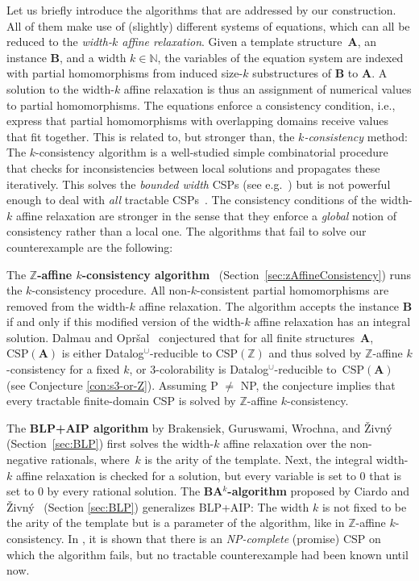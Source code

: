 \documentclass[a4paper,english, thm-restate]{lipics-v2021}
\newcommand{\StructA}{\mathbf{A}}
\newcommand{\StructB}{\mathbf{B}}
\newcommand{\CSP}[1]{\mathrm{CSP}(#1)}
\newcommand{\bbN}{\mathbb{N}}
\newcommand{\bbZ}{\mathbb{Z}}
\begin{document}
	Let us briefly introduce the algorithms that are addressed by our construction.
	All of them make use of (slightly) different systems of equations, which can all be reduced to the \emph{width-$k$ affine relaxation}.
	Given a template structure~$\StructA$, an instance $\StructB$, and a width $k \in \bbN$, the variables of the equation system are indexed with partial homomorphisms from induced size-$k$ substructures of $\StructB$ to $\StructA$. 
	A solution to the width-$k$ affine relaxation is thus an assignment of numerical values to partial homomorphisms. 
	The equations enforce a consistency condition, i.e., express that partial homomorphisms with overlapping domains receive values that fit together. 
	This is related to, but stronger than, the \emph{$k$-consistency} method: The $k$-consistency algorithm is a well-studied simple combinatorial procedure that checks for inconsistencies between local solutions and propagates these iteratively. 
	This solves the \emph{bounded width} CSPs (see e.g.\ \cite{feder1993monotone, barto2009constraint, barto2014}) but is not powerful enough to deal with \emph{all} tractable CSPs~\cite{AtseriasBulatovDalmau2007}. 
	The consistency conditions of the width\nobreakdash-$k$ affine relaxation are stronger in the sense that they enforce a \emph{global} notion of consistency rather than a local one.
	The algorithms that fail to solve our counterexample are the following:
	
	The \textbf{$\bbZ$-affine $k$-consistency algorithm}~\cite{DalmauOprsal2024} (Section~\ref{sec:zAffineConsistency}) runs the $k$-consistency procedure.
	All non-$k$-consistent partial homomorphisms are removed from the width-$k$ affine relaxation.
	The algorithm accepts the instance $\StructB$ if and only if this modified version of the width-$k$ affine relaxation has an integral solution.
	Dalmau and Opr\v{s}al~\cite{DalmauOprsal2024} conjectured that for all finite structures~$\StructA$, $\CSP{\StructA}$ is either Datalog$^\cup$-reducible to $\CSP{\bbZ}$ and thus solved by $\bbZ$-affine $k$-consistency for a fixed $k$, or 3-colorability is Datalog$^\cup$-reducible to~$\CSP{\StructA}$ (see Conjecture \ref{con:s3-or-Z}). Assuming P $\neq$ NP, the conjecture implies that every tractable finite-domain CSP is solved by $\bbZ$-affine $k$-consistency.
	
	The \textbf{BLP+AIP algorithm} by Brakensiek, Guruswami, Wrochna, and Živný~\cite{BrakensiekGWZ2020} (Section~\ref{sec:BLP}) first solves the width-$k$ affine relaxation over the non-negative rationals,
	where~$k$ is the arity of the template.
	Next, the integral width-$k$ affine relaxation is checked for a solution,
	but every variable is set to $0$ that is set to $0$ by every rational solution.
	The \textbf{BA$^k$-algorithm}  proposed by Ciardo and Živný~\cite{CiardoZivny2023BAk} (Section \ref{sec:BLP})
	generalizes BLP+AIP: The width $k$ is not fixed to be the arity of the template but is a parameter of the algorithm, like in $\bbZ$-affine $k$-consistency. In \cite{CiardoZivny2023BAk}, it is shown that there is an \emph{NP-complete} (promise) CSP on which the algorithm fails, but no tractable counterexample had been known until now.
	
\end{document}
